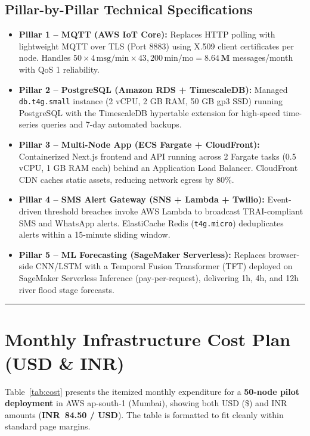 \documentclass[11pt,a4paper]{article}
\newcommand{\colorrule}{\vspace{4pt}\noindent\textcolor{FloodBlue!30}{\rule{\linewidth}{0.5pt}}\vspace{6pt}}
\begin{document}
\subsection{Pillar-by-Pillar Technical Specifications}

\begin{itemize}[leftmargin=1.5em,itemsep=3pt,topsep=2pt]
  \item \textbf{Pillar 1 -- MQTT (AWS IoT Core):} Replaces HTTP polling with lightweight MQTT over TLS (Port 8883) using X.509 client certificates per node. Handles $50 \times 4\,\text{msg/min} \times 43{,}200\,\text{min/mo} = \mathbf{8.64\,M}$ messages/month with QoS 1 reliability.
  \item \textbf{Pillar 2 -- PostgreSQL (Amazon RDS + TimescaleDB):} Managed \texttt{db.t4g.small} instance (2 vCPU, 2 GB RAM, 50 GB gp3 SSD) running PostgreSQL with the TimescaleDB hypertable extension for high-speed time-series queries and 7-day automated backups.
  \item \textbf{Pillar 3 -- Multi-Node App (ECS Fargate + CloudFront):} Containerized Next.js frontend and API running across 2 Fargate tasks (0.5 vCPU, 1 GB RAM each) behind an Application Load Balancer. CloudFront CDN caches static assets, reducing network egress by 80\%.
  \item \textbf{Pillar 4 -- SMS Alert Gateway (SNS + Lambda + Twilio):} Event-driven threshold breaches invoke AWS Lambda to broadcast TRAI-compliant SMS and WhatsApp alerts. ElastiCache Redis (\texttt{t4g.micro}) deduplicates alerts within a 15-minute sliding window.
  \item \textbf{Pillar 5 -- ML Forecasting (SageMaker Serverless):} Replaces browser-side CNN/LSTM with a Temporal Fusion Transformer (TFT) deployed on SageMaker Serverless Inference (pay-per-request), delivering 1h, 4h, and 12h river flood stage forecasts.
\end{itemize}

\colorrule

\section{Monthly Infrastructure Cost Plan (USD \& INR)}

Table~\ref{tab:cost} presents the itemized monthly expenditure for a \textbf{50-node pilot deployment} in AWS ap-south-1 (Mumbai), showing both USD (\$) and INR amounts (\textbf{INR~84.50 / USD}). The table is formatted to fit cleanly within standard page margins.
\end{document}
